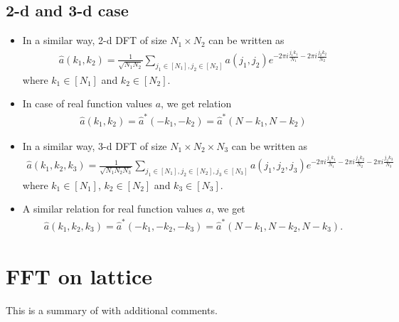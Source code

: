 \documentclass[10pt]{book}
\newcommand{\bea}{\begin{eqnarray}}
\newcommand{\eea}{\end{eqnarray}}
\begin{document}
\subsection{2-d and 3-d case}
\begin{itemize}
	\item In a similar way, 2-d DFT of size $N_1\times N_2$ can be written as
	\bea 
	\hat{a}(k_1,k_2)=\frac{1}{\sqrt{N_1 N_2}}\sum_{j_1\in[N_1], j_2\in [N_2]} a(j_1,j_2) e^{-2\pi i \frac{j_1 k_1}{N_1} -2\pi i \frac{j_2 k_2}{N_2}}
	\eea 
	where $k_1 \in [N_1]$ and $k_2\in [N_2]$.
	\item In case of real function values $a$, we get relation
	\bea 
	\hat{a}(k_1,k_2)=\hat{a}^*(-k_1,-k_2)=\hat{a}^*(N-k_1,N-k_2)
	\eea 
	\item In a similar way, 3-d DFT of size $N_1\times N_2\times N_3$ can be written as
	\bea 
	\hat{a}(k_1,k_2,k_3)=\frac{1}{\sqrt{N_1 N_2 N_3}}\sum_{j_1\in[N_1], j_2\in [N_2], j_3\in [N_3]} 
	a(j_1,j_2,j_3) e^{-2\pi i \frac{j_1 k_1}{N_1} -2\pi i \frac{j_2 k_2}{N_2}-2\pi i \frac{j_3 k_3}{N_3}}
	\eea 
	where $k_1 \in [N_1]$, $k_2\in [N_2]$ and $k_3\in [N_3]$.
	\item A similar relation for real function values $a$, we get 
	\bea 
	\hat{a}(k_1,k_2,k_3)=\hat{a}^*(-k_1,-k_2,-k_3)=\hat{a}^*(N-k_1,N-k_2,N-k_3).
	\eea  
\end{itemize}

\section{FFT on lattice}
This is a summary of \cite{Zheng} with additional comments. 
\end{document}
